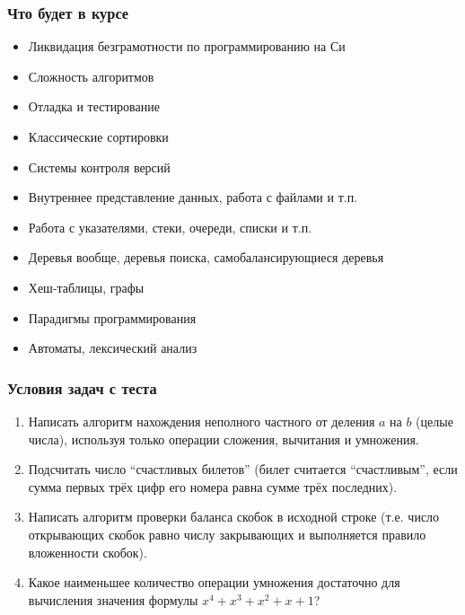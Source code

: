 \documentclass{../../slides-style}
\begin{document}
    \begin{frame}
        \frametitle{Что будет в курсе}
        \begin{itemize}
            \item Ликвидация безграмотности по программированию на Си
            \item Сложность алгоритмов
            \item Отладка и тестирование
            \item Классические сортировки
            \item Системы контроля версий
            \item Внутреннее представление данных, работа с файлами и т.п.
            \item Работа с указателями, стеки, очереди, списки и т.п.
            \item Деревья вообще, деревья поиска, самобалансирующиеся деревья
            \item Хеш-таблицы, графы
            \item Парадигмы программирования
            \item Автоматы, лексический анализ
        \end{itemize}
    \end{frame}

    \begin{frame}
        \frametitle{Условия задач с теста}
        \begin{enumerate}
            \item Написать алгоритм нахождения неполного частного от деления $a$ на $b$ (целые числа), используя только операции сложения, вычитания и умножения.
            \item Подсчитать число \enquote{счастливых билетов} (билет считается \enquote{счастливым}, если сумма первых трёх цифр его номера равна сумме трёх последних).
            \item Написать алгоритм проверки баланса скобок в исходной строке (т.е. число открывающих скобок равно числу закрывающих и выполняется правило вложенности скобок).
            \item Какое наименьшее количество операции умножения достаточно для вычисления значения формулы $x^4 + x^3 + x^2 + x + 1$?
        \end{enumerate}
    \end{frame}
\end{document}
